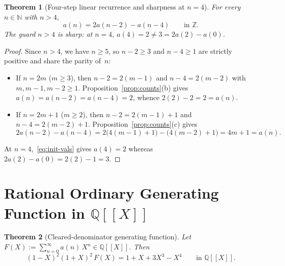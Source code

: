 \documentclass[11pt]{article}
\newcommand{\llbracket}{[\![}
\newcommand{\rrbracket}{]\!]}
\newtheorem{theorem}{Theorem}[section]
\theoremstyle{definition}
\newcommand{\N}{\mathbb{N}}
\newcommand{\Z}{\mathbb{Z}}
\newcommand{\Q}{\mathbb{Q}}
\begin{document}
\begin{theorem}[Four-step linear recurrence and sharpness at $n = 4$]
\label{thm:recurrence}
For every $n \in \N$ with $n > 4$,
\[
a(n) = 2a(n - 2) - a(n - 4) \qquad \text{in }\Z.
\]
The guard $n > 4$ is sharp: at $n = 4$, $a(4) = 2 \ne 3 = 2a(2) - a(0)$.
\end{theorem}

\begin{proof}
Since $n > 4$, we have $n \ge 5$, so $n - 2 \ge 3$ and $n - 4 \ge 1$ are strictly positive and share the parity of~$n$:
\begin{itemize}
\item If $n = 2m$ ($m \ge 3$), then $n - 2 = 2(m - 1)$ and $n - 4 = 2(m - 2)$ with $m, m - 1, m - 2 \ge 1$. Proposition~\ref{prop:counts}(b) gives $a(n) = a(n - 2) = a(n - 4) = 2$, whence $2(2) - 2 = 2 = a(n)$.
\item If $n = 2m + 1$ ($m \ge 2$), then $n - 2 = 2(m - 1) + 1$ and $n - 4 = 2(m - 2) + 1$. Proposition~\ref{prop:counts}(c) gives
\[
2a(n - 2) - a(n - 4) = 2\bigl(4(m - 1) + 1\bigr) - \bigl(4(m - 2) + 1\bigr) = 4m + 1 = a(n).
\]
\end{itemize}
At $n = 4$,~\eqref{eq:init-vals} gives $a(4) = 2$ whereas $2a(2) - a(0) = 2(2) - 1 = 3$.
\end{proof}

\section{Rational Ordinary Generating Function in \texorpdfstring{$\Q\llbracket X \rrbracket$}{Q[[X]]}}

\begin{theorem}[Cleared-denominator generating function]
\label{thm:gf}
Let $F(X) := \sum_{n=0}^{\infty} a(n)\,X^n \in \Q\llbracket X \rrbracket$. Then
\begin{equation}
\label{eq:gf-cleared}
(1 - X)^2 (1 + X)^2 \, F(X) = 1 + X + 3X^3 - X^4 \qquad \text{in }\Q\llbracket X \rrbracket.
\end{equation}
\end{theorem}
\end{document}
